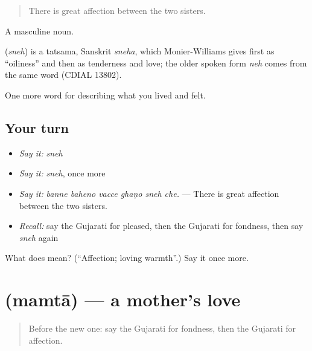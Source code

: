 \begin{quote}
There is great affection between the two sisters.
\end{quote}

A masculine noun.

\begin{cousinweb}
\textbf{} (\emph{sneh}) is a tatsama, Sanskrit \emph{sneha}, which Monier-Williams gives first as \textquotedblleft{}oiliness\textquotedblright{} and then as tenderness and love; the older spoken form \emph{neh} comes from the same word (CDIAL 13802).
\end{cousinweb}

\begin{grammarlens}[title={What you've built}]
One more word for describing what you lived and felt.
\end{grammarlens}

\subsection*{Your turn}
\begin{itemize}
\raggedright
  \item \emph{Say it:} \emph{sneh}
  \item \emph{Say it:} \emph{sneh}, once more
  \item \emph{Say it:} \emph{banne baheno vacce ghaṇo sneh che.} — There is great affection between the two sisters.
  \item \emph{Recall:} say the Gujarati for pleased, then the Gujarati for fondness, then say \emph{sneh} again
\end{itemize}

\begin{tcolorbox}[breakable,colback=teal!4,colframe=teal!35!black,title={Before you move on}]
What does  mean? (\textquotedblleft{}Affection; loving warmth\textquotedblright{}.) Say it once more.
\end{tcolorbox}
\section[\texorpdfstring{\gu{મમતા} (mamtā)}{મમતા (mamtā)}]{ (mamtā) — a mother's love}

\label{lesson:GU-C450-mamta}



\begin{quote}
Before the new one: say the Gujarati for fondness, then the Gujarati for affection.
\end{quote}

